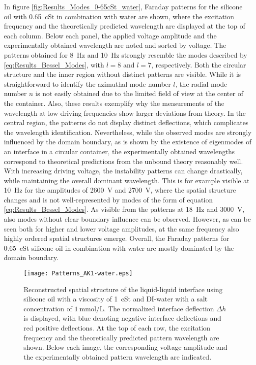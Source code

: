 \documentclass{jfm_arxiv}
\begin{document}
In figure \ref{fig:Results_Modes_0-65cSt_water}, Faraday patterns for the silicone oil with \SI{0.65}{\centi St} in combination with water are shown, where the excitation frequency and the theoretically predicted wavelength are displayed at the top of each column.
Below each panel, the applied voltage amplitude and the experimentally obtained wavelength are noted and sorted by voltage.
The patterns obtained for \SI{8}{\hertz} and \SI{10}{\hertz} strongly resemble the modes described by \ref{eq:Results_Bessel_Modes}, with $l=8$ and $l=7$, respectively. Both the circular structure and the inner region without distinct patterns are visible. While it is straightforward to identify the azimuthal mode number $l$, the radial mode number $n$ is not easily obtained due to the limited field of view at the center of the container. Also, these results exemplify why the measurements of the wavelength at low driving frequencies show larger deviations from theory. In the central region, the patterns do not display distinct deflections, which complicates the wavelength identification.
Nevertheless, while the observed modes are strongly influenced by the domain boundary, as is shown by the existence of eigenmodes of an interface in a circular container, the experimentally obtained wavelengths correspond to theoretical predictions from the unbound theory reasonably well.
With increasing driving voltage, the instability patterns can change drastically, while maintaining the overall dominant wavelength.
This is for example visible at \SI{10}{\hertz} for the amplitudes of \SI{2600}{\volt} and \SI{2700}{\volt}, where the spatial structure changes and is not well-represented by modes of the form of equation \ref{eq:Results_Bessel_Modes}.
As visible from the patterns at \SI{18}{\hertz} and \SI{3000}{\volt}, also modes without clear boundary influence can be observed. However, as can be seen both for higher and lower voltage amplitudes, at the same frequency also highly ordered spatial structures emerge.
Overall, the Faraday patterns for \SI{0.65}{\centi St} silicone oil in combination with water are mostly dominated by the domain boundary. 

\begin{figure}
  \centerline{\texttt{[image: Patterns\_AK1-water.eps]}}%
  \caption{Reconstructed spatial structure of the liquid-liquid interface using silicone oil with a viscosity of \SI{1}{\centi St} and DI-water with a salt concentration of $\SI{1}{\milli\mol\per\liter}$. The normalized interface deflection $\Delta h$ is displayed, with blue denoting negative interface deflections and red positive deflections. At the top of each row, the excitation frequency and the theoretically predicted pattern wavelength are shown. Below each image, the corresponding voltage amplitude and the experimentally obtained pattern wavelength are indicated.
  }
\label{fig:Results_Modes_1cSt_water}
\end{figure}
\end{document}
